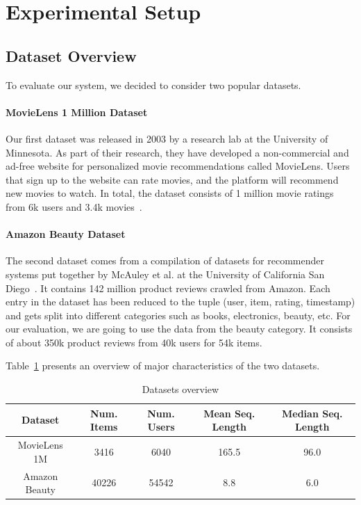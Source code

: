 \section{Experimental Setup}

\subsection{Dataset Overview}

To evaluate our system, we decided to consider two popular datasets.

\paragraph{MovieLens 1 Million Dataset}
Our first dataset was released in 2003 by a research lab at the University of Minnesota. As part of their research, they have developed a non-commercial and ad-free website for personalized movie recommendations called MovieLens. Users that sign up to the website can rate movies, and the platform will recommend new movies to watch. In total, the dataset consists of 1 million movie ratings from 6k users and 3.4k movies~\cite{harper2015movielens, Movielens}. 


\paragraph{Amazon Beauty Dataset}
The second dataset comes from a compilation of datasets for recommender systems put together by McAuley et al. at the University of California San Diego~\cite{Amazon}. It contains 142 million product reviews crawled from Amazon. Each entry in the dataset has been reduced to the tuple (user, item, rating, timestamp) and gets split into different categories such as books, electronics, beauty, etc. For our evaluation, we are going to use the data from the beauty category. It consists of about 350k product reviews from 40k users for 54k items.


Table~\ref{tab:datasets} presents an overview of major characteristics of the two datasets.

\begin{table}[htbp]
\centering
 \begin{tabular}{||c c c c c||} 
 \hline
 Dataset & Num. Items & Num. Users & Mean Seq. Length & Median Seq. Length \\ [0.5ex] 
 \hline\hline
  MovieLens 1M & 3416 & 6040 & 165.5 & 96.0\\
 \hline
 Amazon Beauty & 40226 & 54542 & 8.8 & 6.0 \\ 
 \hline
\end{tabular}
\caption{Datasets overview}
\label{tab:datasets}
\end{table}

